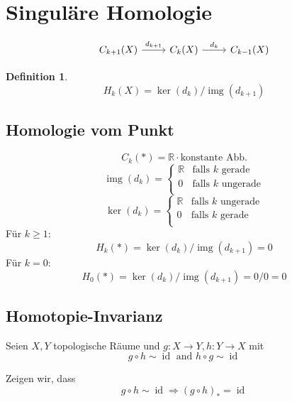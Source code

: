 \documentclass{article}
\title{\titlevar}
\author{\authorvar}
\date{\datevar}
\DeclareMathOperator{\img}{img}
\DeclareMathOperator{\id}{id}
\newtheorem{definition}{Definition}
\begin{document}
	\maketitle
	
	\section{Singuläre Homologie}

	\[\begin{tikzcd}
		{C_{k+1}(X)} & {C_k(X)} & {C_{k-1}(X)}
		\arrow["{d_{k+1}}", from=1-1, to=1-2]
		\arrow["{d_k}", from=1-2, to=1-3]
	\end{tikzcd}\]
	
	\begin{definition}
		\begin{equation*}
			H_k(X) = \ker(d_k) / \img(d_{k+1})
		\end{equation*}
	\end{definition}
	
	\subsection{Homologie vom Punkt}
	
	\begin{equation*}
		C_k(*) = ℝ · \text{konstante Abb.}
	\end{equation*}
	\begin{equation*}
		\img(d_k) = \begin{cases}
			ℝ & \text{falls $k$ gerade}\\
			0 & \text{falls $k$ ungerade}\\
		\end{cases}	
	\end{equation*}
	\begin{equation*}
		\ker(d_k) = \begin{cases}
			ℝ & \text{falls $k$ ungerade}\\
			0 & \text{falls $k$ gerade}\\
		\end{cases}
	\end{equation*}
	Für $k≥1$:
	\begin{equation*}
		H_k(*) = \ker(d_k) / \img(d_{k+1}) = 0
	\end{equation*}
	Für $k=0$:
	\begin{equation*}
		H_0(*) = \ker(d_k) / \img(d_{k+1}) = 0/0 = 0
	\end{equation*}
	
	\subsection{Homotopie-Invarianz}
	
	Seien $X, Y$ topologische Räume und $g: X→Y, h: Y→X$ mit
	\begin{equation*}
		g ∘ h \sim \id \text{ and } h∘g \sim \id
	\end{equation*}
	
	Zeigen wir, dass
	\begin{equation*}
		g∘h \sim \id ⇒ (g∘h)_* = \id
	\end{equation*}
\end{document}
